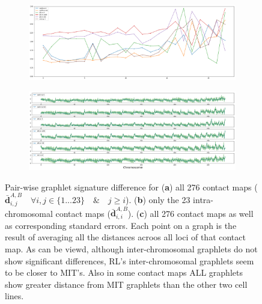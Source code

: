 \documentclass[a4,center,fleqn]{NAR}
\begin{document}
\begin{figure}[t]
    \begin{subfigure}[b]{\textwidth}
        \includegraphics[width=\textwidth]{figures/orbit-distances_intra.png}
        \caption{}
        \label{fig:orbit-distances_intra}
    \end{subfigure}
    \begin{subfigure}[b]{\textwidth}
        \includegraphics[width=\textwidth]{figures/orbit-distances_intra_separate.png}
        \caption{}
        \label{fig:orbit-distances_intra_separate}
    \end{subfigure}
    \caption{   Pair-wise graphlet signature difference for
                (\textbf{a}) all 276 contact maps
                ($\bar{\mathbf{d}}^{\scriptscriptstyle A,B}_{i,j} \quad
                \forall i,j \in \{1 ... 23\} \quad \& \quad j \ge i$).
                (\textbf{b}) only the 23 intra-chromosomal contact maps
                ($\bar{\mathbf{d}}^{\scriptscriptstyle A,B}_{i,i}$).
                (\textbf{c}) all 276 contact maps as well as corresponding
                standard errors.
                Each point on a graph is the result of averaging all
                the distances acroos all loci of that contact map.
                As can be viewd, although inter-chromosomal graphlets 
                do not show significant differences, RL's inter-chromosomal
                graphlets seem to be closer to MIT's. Also in some contact
                maps ALL graphlets show greater distance from MIT graphlets
                than the other two cell lines.
             }
    \label{fig:orbit-distances}
\end{figure}
\end{document}
